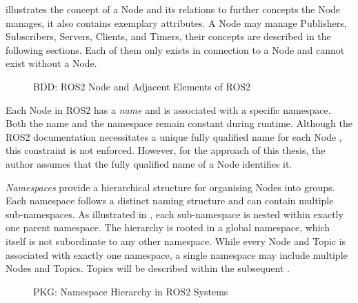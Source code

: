      illustrates the concept of a Node and its relations to further concepts the Node manages, it also contains exemplary attributes. A Node may manage Publishers, Subscribers, Servers, Clients, and Timers, their concepts are described in the following sections. Each of them only exists in connection to a Node and cannot exist without a Node.
    \begin{figure}[h]
        \centering
        
        \caption[The ROS2 Node and Adjacent Elements of ROS2]{BDD: ROS2 Node and Adjacent Elements of ROS2} \label{fig:tikz:BDD:Node}
    \end{figure}

    Each Node in ROS2 has a \emph{name} and is associated with a specific namespace. Both the name and the namespace remain constant during runtime. Although the ROS2 documentation necessitates a unique fully qualified name for each Node \cite{website:fullyQualifiedName}, this constraint is not enforced. However, for the approach of this thesis, the author assumes that the fully qualified name of a Node identifies it.\newline

    \emph{Namespaces} provide a hierarchical structure for organising Nodes into groups. Each namespace follows a distinct naming structure and can contain multiple sub-namespaces. As illustrated in , each sub-namespace is nested within exactly one parent namespace. The hierarchy is rooted in a global namespace, which itself is not subordinate to any other namespace. While every Node and Topic is associated with exactly one namespace, a single namespace may include multiple Nodes and Topics. Topics will be described within the subsequent .\newline
    \begin{figure}[h]
        \centering
        
        \caption[Namespace Hierarchy in ROS2 Systems]{PKG: Namespace Hierarchy in ROS2 Systems} \label{fig:tikz:PKG:Namespaces}
    \end{figure}

